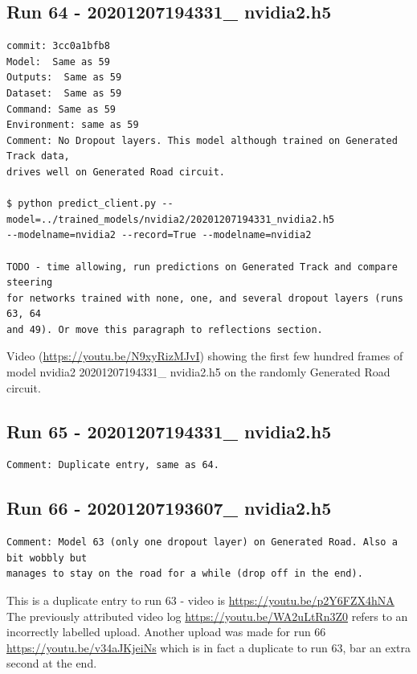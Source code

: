 \subsection{Run 64 - 20201207194331\_ nvidia2.h5}
\begin{verbatim}
commit: 3cc0a1bfb8
Model:  Same as 59
Outputs:  Same as 59
Dataset:  Same as 59
Command: Same as 59
Environment: same as 59 
Comment: No Dropout layers. This model although trained on Generated Track data,
drives well on Generated Road circuit.

$ python predict_client.py --model=../trained_models/nvidia2/20201207194331_nvidia2.h5
--modelname=nvidia2 --record=True --modelname=nvidia2

TODO - time allowing, run predictions on Generated Track and compare steering
for networks trained with none, one, and several dropout layers (runs 63, 64
and 49). Or move this paragraph to reflections section.
\end{verbatim}
Video (\url{https://youtu.be/N9xyRizMJvI}) showing the first few hundred frames of model  
nvidia2 20201207194331\_ nvidia2.h5 on the randomly Generated Road circuit.


\subsection{Run 65 - 20201207194331\_ nvidia2.h5 }
\begin{verbatim}
Comment: Duplicate entry, same as 64.
\end{verbatim}

\subsection{Run 66 - 20201207193607\_ nvidia2.h5}
\label{app_res:65}
\begin{verbatim}
Comment: Model 63 (only one dropout layer) on Generated Road. Also a bit wobbly but
manages to stay on the road for a while (drop off in the end).
\end{verbatim}
This is a duplicate entry to run 63 - video is \url{https://youtu.be/p2Y6FZX4hNA}
The previously attributed video log \url{https://youtu.be/WA2uLtRn3Z0} refers to an incorrectly labelled upload. 
Another upload was made for run 66 \url{https://youtu.be/v34aJKjeiNs} which is in fact a duplicate to run 63, bar an extra second at the end.


